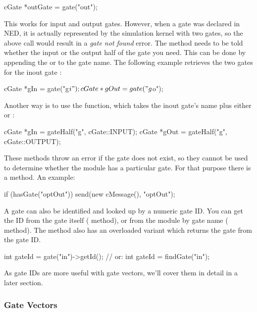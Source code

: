 \begin{cpp}
cGate *outGate = gate("out");
\end{cpp}

This works for input and output gates. However, when a gate was declared
 in NED, it is actually represented by the simulation kernel
with two gates, so the above call would result in a \textit{gate not found}
error. The  method needs to be told whether the input or
the output half of the gate you need. This can be done by appending
the  or  to the gate name. The following example
retrieves the two gates for the inout gate :

\begin{cpp}
cGate *gIn = gate("g$i");
cGate *gOut = gate("g$o");
\end{cpp}

Another way is to use the  function, which takes
the inout gate's name plus either  or :

\begin{cpp}
cGate *gIn = gateHalf("g", cGate::INPUT);
cGate *gOut = gateHalf("g", cGate::OUTPUT);
\end{cpp}

These methods throw an error if the gate does not exist, so they cannot
be used to determine whether the module has a particular gate.
For that purpose there is a  method. An example:

\begin{cpp}
if (hasGate("optOut"))
   send(new cMessage(), "optOut");
\end{cpp}

A gate can also be identified and looked up by a numeric gate ID.
You can get the ID from the gate itself ( method),
or from the module by gate name ( method).
The  method also has an overloaded variant which
returns the gate from the gate ID.

\begin{cpp}
int gateId = gate("in")->getId();  // or:
int gateId = findGate("in");
\end{cpp}

As gate IDs are more useful with gate vectors, we'll cover them
in detail in a later section.


\subsubsection{Gate Vectors}

